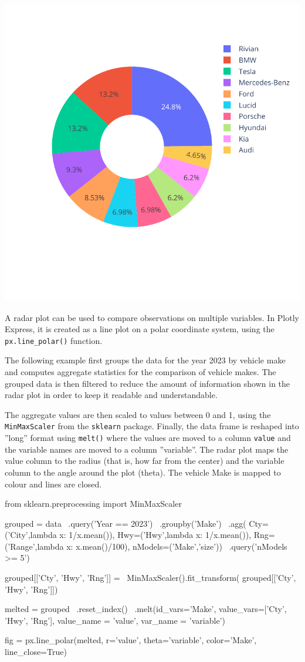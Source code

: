 \begin{center}
  \includegraphics[width=.6\textwidth]{px.fuel.pie.pdf}
\end{center}

A radar plot can be used to compare observations on multiple variables. In Plotly Express, it is created as a line plot on a polar coordinate system, using the \texttt{px.line\_polar()} function. 

The following example first groups the data for the year 2023 by vehicle make and computes aggregate statistics for the comparison of vehicle makes. The grouped data is then filtered to reduce the amount of information shown in the radar plot in order to keep it readable and understandable. 

The aggregate values are then scaled to values between 0 and 1, using the \texttt{MinMaxScaler} from the \texttt{sklearn} package. Finally, the data frame is reshaped into ''long'' format using \texttt{melt()} where the values are moved to a column \texttt{value} and the variable names are moved to a column ''variable''. The radar plot maps the value column to the radius (that is, how far from the center) and the variable column to the angle around the plot (theta). The vehicle Make is mapped to colour and lines are closed. 

\begin{pythoncode}
from sklearn.preprocessing import MinMaxScaler

grouped = data \
  .query('Year == 2023') \
  .groupby('Make') \
  .agg(
      Cty=('City',lambda x: 1/x.mean()),
      Hwy=('Hwy',lambda x: 1/x.mean()),
      Rng=('Range',lambda x: x.mean()/100),
      nModels=('Make','size')) \
  .query('nModels >= 5')
  
grouped[['Cty', 'Hwy', 'Rng']] = \
  MinMaxScaler().fit_transform(
    grouped[['Cty', 'Hwy', 'Rng']])

melted = grouped \
  .reset_index() \
  .melt(id_vars='Make', 
        value_vars=['Cty', 'Hwy', 'Rng'],
        value_name = 'value',
        var_name = 'variable')
  
fig = px.line_polar(melted, 
     r='value', theta='variable', 
     color='Make', line_close=True)
\end{pythoncode}

